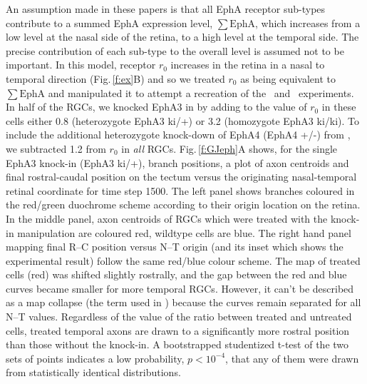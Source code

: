 \documentclass[9pt,lineno]{elife}
\begin{document}
An assumption made in these papers is that all EphA receptor sub-types contribute to a summed EphA expression level, $\sum\mathrm{EphA}$, which increases from a low level at the nasal side of the retina, to a high level at the temporal side. 
The precise contribution of each sub-type to the overall level is assumed not to be important. 
In this model, receptor $r_0$ increases in the retina in a nasal to temporal direction (Fig.\,\ref{f:ex}B) and so we treated $r_0$ as being equivalent to $\sum\mathrm{EphA}$ and manipulated it to attempt a recreation of the \citet{brown_topographic_2000}~and \citet{reber_relative_2004}~experiments. 
In half of the RGCs, we knocked EphA3 in by adding to the value of $r_0$ in these cells either 0.8 (heterozygote EphA3 ki/+) or 3.2 (homozygote EphA3 ki/ki). 
To include the additional heterozygote knock-down of EphA4 (EphA4 +/-) from \citet{reber_relative_2004}, we subtracted 1.2 from $r_0$ in \emph{all} RGCs.
Fig.\,\ref{f:GJeph}A shows, for the single EphA3 knock-in (EphA3 ki/+), branch positions, a plot of axon centroids and final rostral-caudal position on the tectum versus the originating nasal-temporal retinal coordinate for time step 1500. 
The left panel shows branches coloured in the red/green duochrome scheme according to their origin location on the retina.
In the middle panel, axon centroids of RGCs which were treated with the knock-in manipulation are coloured red, wildtype cells are blue. 
The right hand panel mapping final R--C position versus N--T origin  (and its inset which shows the experimental result) follow the same red/blue colour scheme.
The map of treated cells (red) was shifted slightly rostrally, and the gap between the red and blue curves became smaller for more temporal RGCs. However, it can't be described as a map collapse (the term used in \citet{brown_topographic_2000}) because the curves remain separated for all N--T values. Regardless of the value of the ratio between treated and untreated cells, treated temporal axons are drawn to a significantly more rostral position than those without the knock-in. A bootstrapped studentized t-test of the two sets of points indicates a low probability, $p<10^{-4}$, that any of them were drawn from statistically identical distributions.
\end{document}
